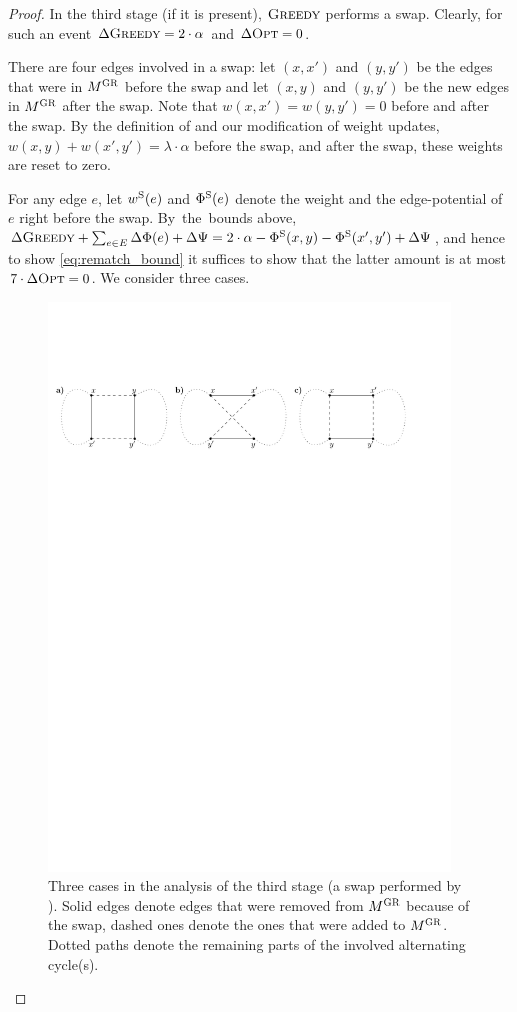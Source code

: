 \begin{proof}
In the third stage (if it is present), $\textsc{Greedy}$ performs a swap. Clearly, for
such an event $\Delta \textsc{Greedy} = 2 \cdot \alpha$ and $\Delta \textsc{Opt} = 0$. 

There are four edges involved in a swap: let $(x,x')$ and $(y,y')$ be the
edges that were in $M^\textsc{GR}$ before the swap and let $(x,y)$ and $(y,y')$ be
the new edges in $M^\textsc{GR}$ after the swap. Note that $w(x,x') = w(y,y') = 0$
before and after the swap. By the definition of \GREEDY and our modification
of weight updates, $w(x,y) + w(x',y') = \lambda
\cdot \alpha$ before the swap, and after the swap, these weights are reset to
zero.

For any edge $e$, let $w^\textrm{S}(e)$ and $\Phi^\textrm{S}(e)$ denote the weight and the
edge-potential of~$e$ right before the swap. By~the~bounds above, $\Delta
\textsc{Greedy} + \sum_{e \in E} \Delta \Phi(e) + \Delta\Psi = 2 \cdot \alpha -
\Phi^\textrm{S}(x,y) - \Phi^\textrm{S}(x',y') + \Delta \Psi$, and hence to show
\eqref{eq:rematch_bound} it suffices to show that the latter amount is at most
$7 \cdot \Delta \textsc{Opt} = 0$. We consider three cases.

\begin{figure}
\centering
\includegraphics[width=0.95\textwidth]{figs/dynamic-mapping/fig_rematch}
\caption{Three cases in the analysis of the third stage (a swap performed by
\GREEDY). Solid edges denote edges that were removed from $M^\textsc{GR}$ because
of the swap, dashed ones denote the ones that were added to $M^\textsc{GR}$. Dotted
paths denote the remaining parts of the involved alternating cycle(s).}
\label{fig:rematch}
\end{figure}


\end{proof}
